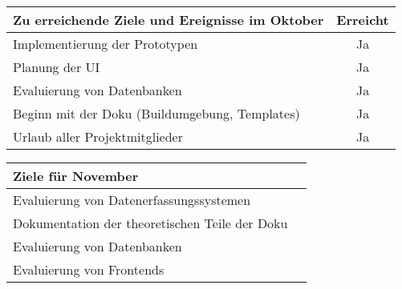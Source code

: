 \begin{tabularx}{\textwidth}{Xc}
    \arrayrulecolor{OliveGreen}
    \toprule
    {\bfseries Zu erreichende Ziele und Ereignisse im Oktober} & {\bfseries Erreicht} \\
    \midrule[2pt]
    Implementierung der Prototypen                             &Ja                    \\
    \rowcolor{OliveGreen!15}
    Planung der UI                                             &Ja                    \\
    \rowcolor{White}
    Evaluierung von Datenbanken                                &Ja                    \\
    \rowcolor{OliveGreen!15}
    Beginn mit der Doku (Buildumgebung, Templates)             &Ja                    \\
    \rowcolor{White}
    Urlaub aller Projektmitglieder                             &Ja                    \\
    \bottomrule[2pt]
\end{tabularx}
%
\vspace{1cm}
%
\begin{tabularx}{\textwidth}{Xc}
    \arrayrulecolor{OliveGreen}
    \toprule
    {\bfseries Ziele für November}                       &                      \\
    \midrule[2pt]
    Evaluierung von Datenerfassungssystemen              &                      \\
    \rowcolor{OliveGreen!15}
    Dokumentation der theoretischen Teile der Doku      &                      \\
    \rowcolor{White}
    Evaluierung von Datenbanken                          &                      \\
    \rowcolor{OliveGreen!15}
    Evaluierung von Frontends                            &                      \\
\end{tabularx}
